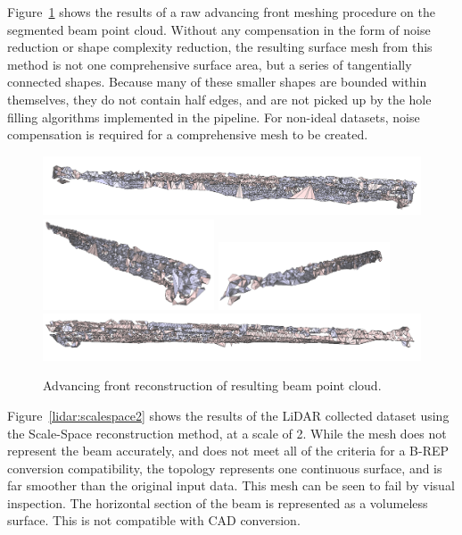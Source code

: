 \documentclass[12pt]{drexelthesis}
\begin{document}
Figure~\ref{lidar:advancefront} shows the results of a raw advancing front meshing procedure on the segmented beam point cloud. Without any compensation in the form of noise reduction or shape complexity reduction, the resulting surface mesh from this method is not one comprehensive surface area, but a series of tangentially connected shapes. Because many of these smaller shapes are bounded within themselves, they do not contain half edges, and are not picked up by the hole filling algorithms implemented in the pipeline. For non-ideal datasets, noise compensation is required for a comprehensive mesh to be created.


\begin{figure}[!ht]
	\centering
		\includegraphics[width=5in]{real-lab-scans/meshedNeat/advancedfront00.png}
		\includegraphics[width=2in]{real-lab-scans/meshedNeat/advancedfront01.png}
		\includegraphics[width=2in]{real-lab-scans/meshedNeat/advancedfront02.png}
		\includegraphics[width=5in]{real-lab-scans/meshedNeat/advancedfront03.png}
		\caption[Advancing front reconstruction of segmented LiDAR data]{\centering Advancing front reconstruction of resulting beam point cloud.}
	\label{lidar:advancefront}
\end{figure}

Figure~\ref{lidar:scalespace2} shows the results of the LiDAR collected dataset using the Scale-Space reconstruction method, at a scale of 2. While the mesh does not represent the beam accurately, and does not meet all of the criteria for a B-REP conversion compatibility, the topology represents one continuous surface, and is far smoother than the original input data. This mesh can be seen to fail by visual inspection. The horizontal section of the beam is represented as a volumeless surface. This is not compatible with CAD conversion.
\end{document}
